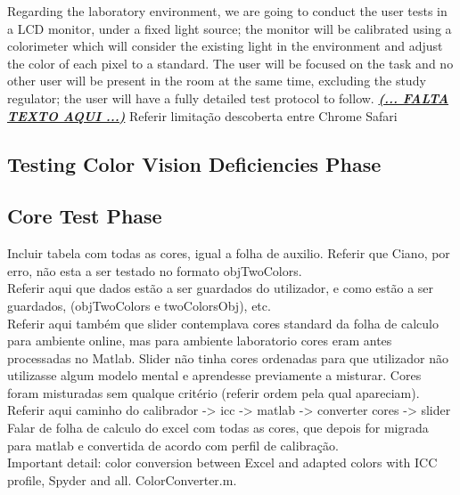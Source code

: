 %
Regarding the laboratory environment, we are going to conduct the user tests in a LCD monitor, under a fixed light source; the monitor will be calibrated
using a colorimeter which will consider the existing light in the environment and adjust the color of each pixel to a standard. The user will be focused on
the task and no other user will be present in the room at the same time, excluding the study regulator; the user will have a fully detailed test protocol to
follow.
%
\textbf{\underline{\emph{(... FALTA TEXTO AQUI ...)}}}
%
Referir limitação descoberta entre Chrome Safari
%
\subsection{Testing Color Vision Deficiencies Phase}
\label{subsec:design_ishihara}
%
\subsection{Core Test Phase}
\label{subsec:design_core}
%
Incluir tabela com todas as cores, igual a folha de auxilio. Referir que Ciano, por erro, não esta a ser testado no formato objTwoColors. \\
Referir aqui que dados estão a ser guardados do utilizador, e como estão a ser guardados, (objTwoColors e twoColorsObj), etc. \\
Referir aqui também que slider contemplava cores standard da folha de calculo para ambiente online,
mas para ambiente laboratorio cores eram antes processadas no Matlab. Slider não tinha cores ordenadas para que utilizador não utilizasse
algum modelo mental e aprendesse previamente a misturar. Cores foram misturadas sem qualque critério (referir ordem pela qual apareciam). \\
Referir aqui caminho do calibrador -> icc -> matlab -> converter cores -> slider \\
Falar de folha de calculo do excel com todas as cores, que depois for migrada para matlab
e convertida de acordo com perfil de calibração. \\
Important detail: color conversion between Excel and adapted colors with ICC profile, Spyder and all. ColorConverter.m. \\
%
